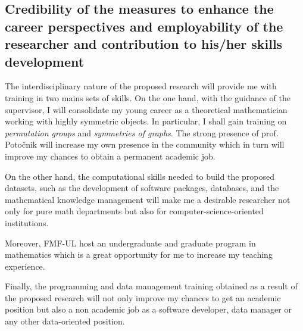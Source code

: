 \subsection{Credibility of the measures to enhance the career perspectives and employability of the researcher and contribution to his/her skills development}
\label{sec:impactresearcher}

The interdisciplinary nature of the proposed research will provide me with training in two mains sets of skills.
On the one hand, with the guidance of the supervisor, I will consolidate my young career as a theoretical mathematician working with highly symmetric objects.
In particular, I shall gain training on \emph{permutation groups} and \emph{symmetries of graphs}.
The strong presence of prof. Potočnik will increase my own presence in the community which in turn will improve my chances to obtain a permanent academic job.

On the other hand, the computational skills needed to build the proposed datasets, such as the development of software packages, databases, and the mathematical knowledge management will make me a desirable researcher not only for pure math departments but also for computer-science-oriented institutions.

Moreover, FMF-UL host an undergraduate and graduate program in mathematics which is a great opportunity for me to increase my teaching experience.

Finally, the programming and data management training obtained as a result of the proposed research will not only improve my chances to get an academic position but also a non academic job as a software developer, data manager or any other data-oriented position.
